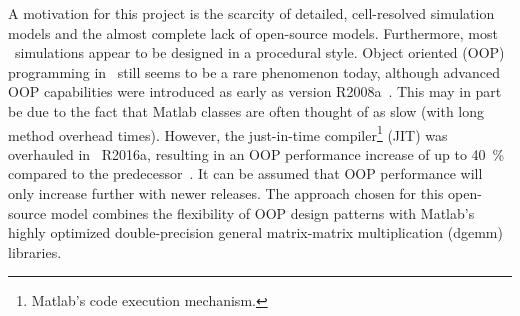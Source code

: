 A motivation for this project is the scarcity of detailed, cell-resolved simulation models and the almost complete lack of open-source models. Furthermore, most \matlab\ simulations appear to be designed in a procedural style. Object oriented (OOP) programming in \matlab\ still seems to be a rare phenomenon today, although advanced OOP capabilities were introduced as early as version R2008a~\cite{foti_inside_2008}. This may in part be due to the fact that Matlab classes are often thought of as slow (with long method overhead times). However, the just-in-time compiler\footnote{Matlab's code execution mechanism.} (JIT) was overhauled in \matlab\ R2016a, resulting in an OOP performance increase of up to 40~\% compared to the predecessor~\cite{_matlab_2016}. It can be assumed that OOP performance will only increase further with newer releases. The approach chosen for this open-source model combines the flexibility of OOP design patterns with Matlab's highly optimized double-precision general matrix-matrix multiplication (dgemm) libraries.